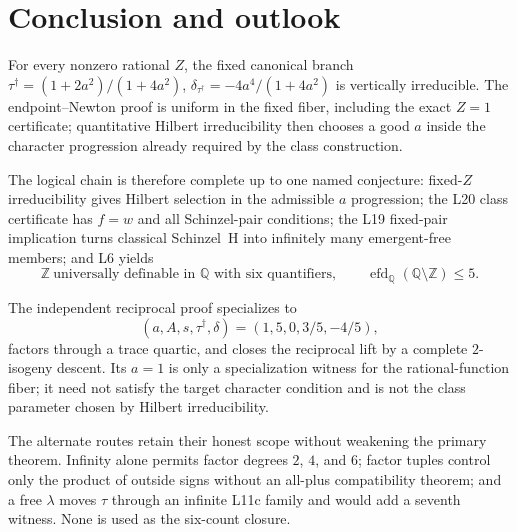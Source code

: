 \documentclass[11pt]{amsart}
\theoremstyle{definition}
\theoremstyle{remark}
\newcommand{\Q}{\mathbb{Q}}
\newcommand{\Z}{\mathbb{Z}}
\begin{document}
\maketitle
\tableofcontents













\section{Conclusion and outlook}

For every nonzero rational $Z$, the fixed canonical branch
$\tau^\dagger=(1+2a^2)/(1+4a^2)$,
$\delta_{\tau^\dagger}=-4a^4/(1+4a^2)$ is vertically irreducible.  The
endpoint--Newton proof is uniform in the fixed fiber, including the exact
$Z=1$ certificate; quantitative Hilbert irreducibility then chooses a good
$a$ inside the character progression already required by the class
construction.

The logical chain is therefore complete up to one named conjecture:
fixed-$Z$ irreducibility gives Hilbert selection in the admissible
$a$ progression; the L20 class certificate has $f=w$ and all
Schinzel-pair conditions; the L19 fixed-pair implication turns classical
Schinzel~H into infinitely many emergent-free members; and L6 yields
\[
 \Z\ \text{universally definable in }\Q\text{ with six quantifiers},
 \qquad
 \operatorname{efd}_{\Q}(\Q\setminus\Z)\le5.
\]

The independent reciprocal proof specializes to
\[
 (a,A,s,\tau^\dagger,\delta)=(1,5,0,3/5,-4/5),
\]
factors through a trace quartic, and closes the reciprocal lift by a
complete $2$-isogeny descent.
Its $a=1$ is only a specialization witness for the rational-function
fiber; it need not satisfy the target character condition and is not the
class parameter chosen by Hilbert irreducibility.

The alternate routes retain their honest scope without weakening the
primary theorem.  Infinity alone permits factor degrees $2$, $4$, and
$6$; factor tuples control only the product of outside signs without an
all-plus compatibility theorem; and a free $\lambda$ moves $\tau$ through
an infinite L11c family and would add a seventh witness.  None is used as
the six-count closure.
\end{document}
